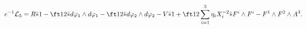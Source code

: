 \begin{equation}
e^{-1}{\cal L}_5 = R\bar *1-\ft12\bar*d\varphi_1\wedge d\varphi_1
-\ft12\bar*d\varphi_2\wedge d\varphi_2-V\bar*1+\ft12\sum_{i=1}^3
\eta_iX_i^{-2}\bar*F^i\wedge F^i-F^1\wedge F^2\wedge A^3.
\label{eq:d5n2lag}
\end{equation}


